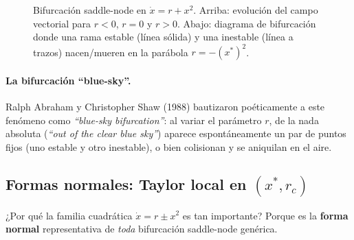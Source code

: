 \begin{figure}[htbp]
\caption{Bifurcación saddle-node en $\dot{x} = r + x^2$. Arriba: evolución del campo vectorial para $r < 0$, $r = 0$ y $r > 0$. Abajo: diagrama de bifurcación donde una rama estable (línea sólida) y una inestable (línea a trazos) nacen/mueren en la parábola $r = -(x^*)^2$.}
\label{fig:bifurcacion_saddle_node}
\end{figure}

\paragraph{La bifurcación ``blue-sky''.}
Ralph Abraham y Christopher Shaw (1988) \cite{abraham1988} bautizaron poéticamente a este fenómeno como \emph{``blue-sky bifurcation''}: al variar el parámetro $r$, de la nada absoluta (\emph{``out of the clear blue sky''}) aparece espontáneamente un par de puntos fijos (uno estable y otro inestable), o bien colisionan y se aniquilan en el aire.

\subsection{Formas normales: Taylor local en $(x^{*}, r_{c})$}

¿Por qué la familia cuadrática $\dot{x} = r \pm x^2$ es tan importante? Porque es la \textbf{forma normal} representativa de \emph{toda} bifurcación saddle-node genérica.

